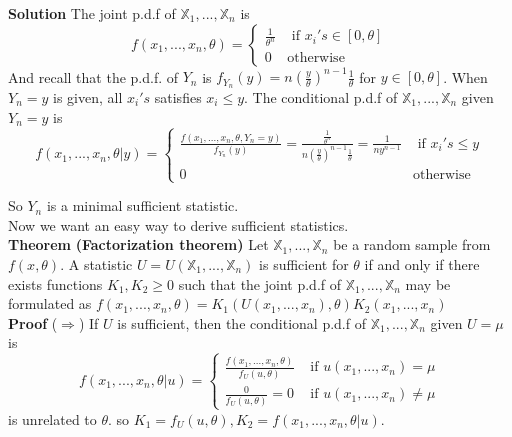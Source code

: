 \textbf{Solution} The joint p.d.f of $\mathbb{X}_1, ..., \mathbb{X}_n$ is
$$f(x_1, ..., x_n, \theta) = 
\begin{cases}
\frac{1}{\theta^n} & \text{ if } x_i's \in [0, \theta]\\
0 & \text{otherwise}
\end{cases}$$
And recall that the p.d.f. of $Y_n$ is $f_{Y_n}(y) = n(\frac{y}{\theta})^{n-1}\frac{1}{\theta}$ for $y\in[0,\theta]$. When $Y_n = y$ is given, all $x_i's$ satisfies $x_i \leq y$. The conditional p.d.f of $\mathbb{X}_1, ..., \mathbb{X}_n$ given $Y_n = y$ is
$$f(x_1, ..., x_n, \theta | y) = 
\begin{cases}
\frac{f(x_1, ..., x_n, \theta, Y_n = y)}{f_{Y_n}(y)} =
 \frac{\frac{1}{\theta^n}}{n(\frac{y}{\theta})^{n-1}\frac{1}{\theta}} = \frac{1}{ny^{n-1}} & \text{ if } x_i's \leq y\\
0 & \text{otherwise}
\end{cases}$$

So $Y_n$ is a minimal sufficient statistic.\\

Now we want an easy way to derive sufficient statistics.\\

\textbf{Theorem} \textbf{(Factorization theorem)} Let $\mathbb{X}_1, ..., \mathbb{X}_n$ be a random sample from $f(x, \theta)$. A statistic $U = U(\mathbb{X}_1, ..., \mathbb{X}_n)$ is sufficient for $\theta$ if and only if there exists functions $K_1, K_2 \geq 0$ such that the joint p.d.f of $\mathbb{X}_1, ..., \mathbb{X}_n$ may be formulated as $f(x_1, ..., x_n, \theta) = K_1(U(x_1, ..., x_n), \theta)K_2(x_1, ..., x_n)$\\

\textbf{Proof} ($\Rightarrow$) If $U$ is sufficient, then the conditional p.d.f of $\mathbb{X}_1, ..., \mathbb{X}_n$ given $U=\mu$ is
$$f( x_1, ..., x_n, \theta | u ) = 
\begin{cases}
\frac{f(x_1, ..., x_n, \theta)}{f_U(u, \theta)} & \text{ if } u(x_1, ..., x_n) = \mu \\
\frac{0}{f_U(u, \theta)} = 0 & \text{ if } u(x_1, ..., x_n) \neq \mu
\end{cases}$$
is unrelated to $\theta$. so $K_1 = f_U(u, \theta), K_2 = f(x_1, ..., x_n, \theta | u)$.\\

